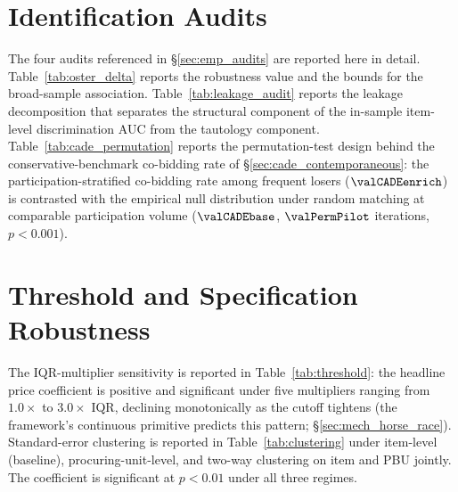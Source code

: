 \section{Identification Audits}
\label{app:online_robustness}

The four audits referenced in §\ref{sec:emp_audits} are reported
here in detail. Table~\ref{tab:oster_delta} reports the
\citet{cinelli2020making} robustness value and the
\citet{oster2019unobservable} bounds for the broad-sample
association. Table~\ref{tab:leakage_audit} reports the leakage
decomposition that separates the structural component of the
in-sample item-level discrimination AUC from the tautology
component. Table~\ref{tab:cade_permutation} reports the
permutation-test design behind the conservative-benchmark
co-bidding rate of §\ref{sec:cade_contemporaneous}: the
participation-stratified co-bidding rate among frequent losers
($\valCADEenrich$) is contrasted with the empirical null
distribution under random matching at comparable participation
volume ($\valCADEbase$, $\valPermPilot$ iterations,
$p<0.001$).







\section{Threshold and Specification Robustness}
\label{app:robustness_tables}

The IQR-multiplier sensitivity is reported in
Table~\ref{tab:threshold}: the headline price coefficient is
positive and significant under five multipliers ranging from
$1.0\!\times$ to $3.0\!\times$ IQR, declining monotonically as
the cutoff tightens (the framework's continuous primitive
predicts this pattern; §\ref{sec:mech_horse_race}). Standard-error
clustering is reported in Table~\ref{tab:clustering} under
item-level (baseline), procuring-unit-level, and two-way
\citet{cameron2011robust} clustering on item and PBU jointly.
The coefficient is significant at $p<0.01$ under all three
regimes.

\begin{table}[htbp]
\centering
\caption{Price Coefficient Across IQR Multiplier Thresholds}
\label{tab:threshold}

\end{table}

